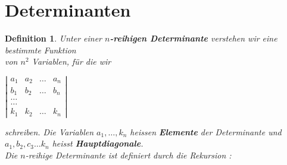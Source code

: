 \documentclass[a4paper,10pt]{report}
\newtheorem{mydef}{Definition}
\begin{document}
\section{Determinanten} 
\begin{mydef}
Unter einer $n$\textit{\textbf{-reihigen
Determinante}} verstehen wir eine bestimmte Funktion \\ von $n^2$
Variablen, f\"{u}r die wir
\begin{center}

$ \left | \begin {array}{cccc} a_1 & a_2 & \dots  & a_n\\
                                b_1 & b_2 & \dots & b_n\\
                                \dots\\
                                \dots\\
                                k_1 & k_2 & \dots & k_n\end{array} \right | $
\end{center}
schreiben. Die Variablen $a_1, \dots , k_n$ heissen
\textit{\textbf{Elemente}} der Determinante und $ a_1, b_2, c_3 \dots k_n$ heisst \textit{\textbf{Hauptdiagonale}}.\\
Die $n$-reihige Determinante ist definiert durch die Rekursion :

\vspace{0.5cm}


\end{mydef}
\end{document}

